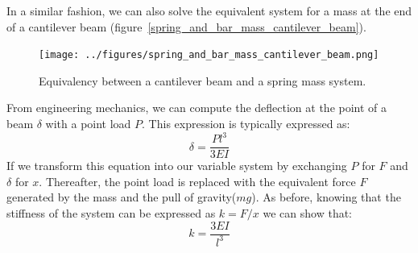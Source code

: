 \documentclass[12pt,letter]{article}
\begin{document}
			\pagebreak	
			In a similar fashion, we can also solve the equivalent system for a mass at the end of a cantilever beam (figure~\ref{spring_and_bar_mass_cantilever_beam}).
			\begin{figure}[H]
				\centering
				\texttt{[image: ../figures/spring\_and\_bar\_mass\_cantilever\_beam.png]}
				\caption{Equivalency between a cantilever beam and a spring mass system.}
				\label{fig:spring_and_bar_mass_cantilever_beam}
			\end{figure}			
			From engineering mechanics, we can compute the deflection at the point of a beam $\delta$ with a point load $P$. This expression is typically expressed as:
			\begin{equation}
				\delta = \frac{Pl^3}{3EI}
			\end{equation}					
			If we transform this equation into our variable system by exchanging $P$ for $F$ and $\delta$ for $x$. Thereafter, the point load is replaced with the equivalent force $F$ generated by the mass and the pull of gravity($mg$). As before, knowing that the stiffness of the system can be expressed as $k=F/x$ we can show that:
			\begin{equation}
				k = \frac{3EI}{l^3}
			\end{equation}	
\end{document}
